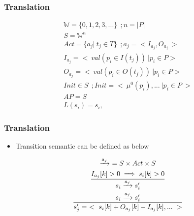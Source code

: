 \begin{frame}
    \frametitle{Translation}
    \begin{gather*}
        \mathbb{W} = \{0, 1, 2, 3, ...\} ~ ~ ; n = | P |
        \\
        S =\mathbb{W} ^ n
        \\
        Act = \{a_j   | ~ t_j \in T\} ~ ~ ; a_j = < I_{a_j},  O_{a_j} ~ >
        \\
        I_{a_j} = < ~ val(p_i \in I(t_j)) ~ | p_i \in P>
        \\
        O_{a_j} = < ~ val(p_i \in O(t_j)) ~ | p_i \in P>
        \\
        Init \in S ~ ~; Init = <~ \mu^0(p_i), ...  ~ |  p_i \in P ~ >
        \\
        AP = S
        \\
        L(s_i) = {s_i,}
    \end{gather*}
\end{frame}

\begin{frame}
    \frametitle{Translation}
    \begin{itemize}
        \item {Transition semantic can be defined as below}
    \end{itemize}
    \begin{gather*}
        \xrightarrow{a_j} \ = S \times Act \times S
        \\
        {
        I_{a_j}[k] > 0 \implies s_i[k] > 0
        \over
        s_i \xrightarrow{a_j} s'_i
        }
        \\
        {
        s_i \xrightarrow{a_j} s'_i
        \over
        s'_j = ~ < ~ s_i[k] + O_{a_j}[k] - I_{a_j}[k] , ... ~ >
        }
    \end{gather*}
\end{frame}


